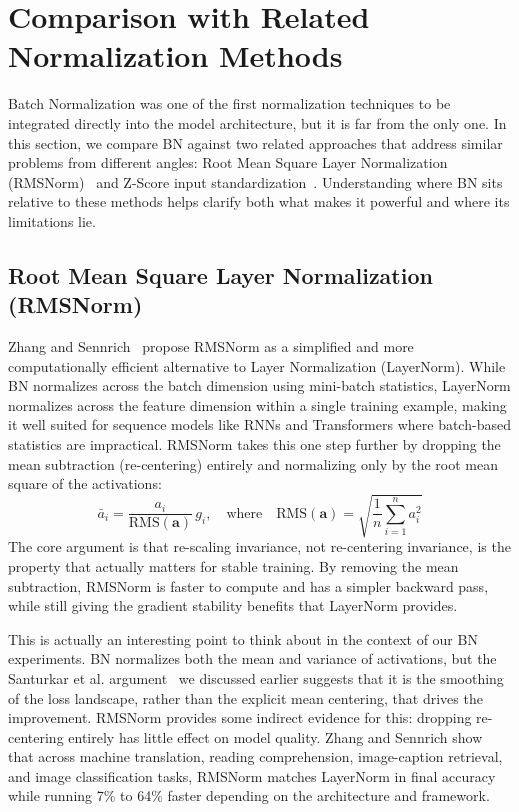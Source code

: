 \documentclass{article}
\begin{document}
\section{Comparison with Related Normalization Methods}

Batch Normalization was one of the first normalization techniques to be integrated directly
into the model architecture, but it is far from the only one. In this section, we compare BN
against two related approaches that address similar problems from different angles: Root Mean
Square Layer Normalization (RMSNorm)~\cite{zhang2019rmsnorm} and Z-Score input
standardization~\cite{alfaiz2018zscore}. Understanding where BN sits relative to these methods
helps clarify both what makes it powerful and where its limitations lie.

\subsection{Root Mean Square Layer Normalization (RMSNorm)}

Zhang and Sennrich~\cite{zhang2019rmsnorm} propose RMSNorm as a simplified and more
computationally efficient alternative to Layer Normalization (LayerNorm). While BN normalizes
across the batch dimension using mini-batch statistics, LayerNorm normalizes across the feature
dimension within a single training example, making it well suited for sequence models like
RNNs and Transformers where batch-based statistics are impractical. RMSNorm takes this one
step further by dropping the mean subtraction (re-centering) entirely and normalizing only
by the root mean square of the activations:
\begin{equation}
  \bar{a}_i = \frac{a_i}{\mathrm{RMS}(\mathbf{a})}\, g_i, \quad
  \text{where} \quad \mathrm{RMS}(\mathbf{a}) = \sqrt{\frac{1}{n}\sum_{i=1}^{n} a_i^2}
\end{equation}
The core argument is that re-scaling invariance, not re-centering invariance, is the property
that actually matters for stable training. By removing the mean subtraction, RMSNorm is faster
to compute and has a simpler backward pass, while still giving the gradient stability benefits
that LayerNorm provides.

This is actually an interesting point to think about in the context of our BN experiments.
BN normalizes both the mean and variance of activations, but the Santurkar et al.
argument~\cite{santurkar2018does} we discussed earlier suggests that it is the smoothing of
the loss landscape, rather than the explicit mean centering, that drives the improvement.
RMSNorm provides some indirect evidence for this: dropping re-centering entirely has little
effect on model quality. Zhang and Sennrich show that across machine translation, reading
comprehension, image-caption retrieval, and image classification tasks, RMSNorm matches
LayerNorm in final accuracy while running 7\% to 64\% faster depending on the architecture
and framework.
\end{document}
